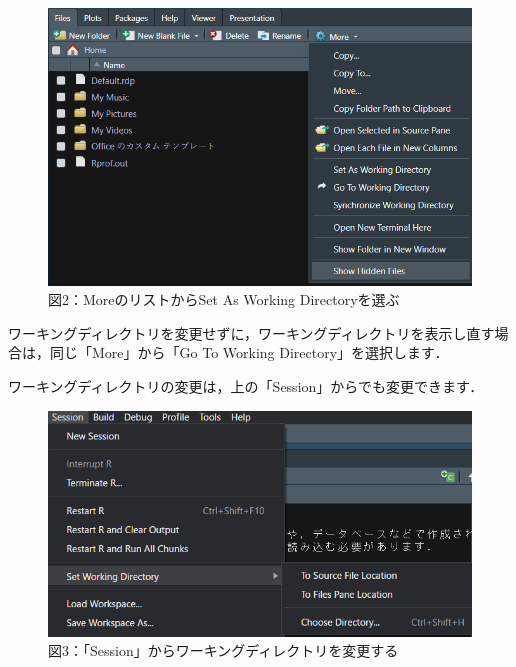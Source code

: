 \documentclass[
  letterpaper,
  DIV=11,
  numbers=noendperiod]{scrreprt}
\begin{document}
\begin{figure}

{\centering \includegraphics{././image/filestab_options.png}

}

\caption{図2：MoreのリストからSet As Working Directoryを選ぶ}

\end{figure}

ワーキングディレクトリを変更せずに，ワーキングディレクトリを表示し直す場合は，同じ「More」から「Go
To Working Directory」を選択します．

ワーキングディレクトリの変更は，上の「Session」からでも変更できます．

\begin{figure}

{\centering \includegraphics{././image/Session_SetWD.png}

}

\caption{図3：「Session」からワーキングディレクトリを変更する}

\end{figure}
\end{document}
